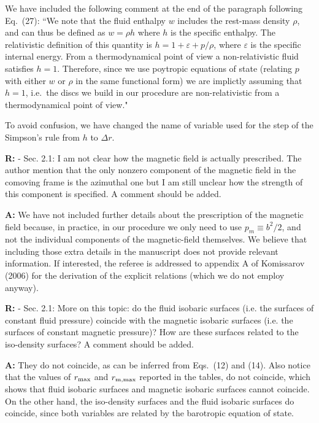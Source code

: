 \documentclass{article}
\begin{document}
\bigskip 

We have included the following comment at the end of the paragraph following Eq.~(27): 
``We note that the fluid enthalpy $w$ includes the rest-mass density $\rho$, and can thus be defined as $w=\rho h$ where
$h$ is the specific enthalpy. The relativistic definition of this quantity is $h=1+\varepsilon+p/\rho$, where $\varepsilon$ is
the specific internal energy. From a thermodynamical point of view a non-relativistic fluid satisfies $h=1$. Therefore,
since we use poytropic equations of state (relating $p$ with either $w$ or $\rho$ in the same functional form) we are
implictly assuming that $h=1$, i.e.~the discs we build in our procedure are non-relativistic from a thermodynamical point of view."

\bigskip

To avoid confusion, we have changed the name of variable used for the step of the Simpson's rule from $h$ to $\Delta r$.

\bigskip

{\bf R:} - Sec. 2.1: I am not clear how the magnetic field is actually
prescribed. The author mention that the only nonzero component of
the magnetic field in the comoving frame is the azimuthal one but I am
still unclear how the strength of this component is specified. A
comment should be added.

\bigskip

{\bf A:} We have not included further details about the prescription of the magnetic field because, in practice, in our procedure we 
only need to use $p_m\equiv b^2/2$,
and not the individual components of the magnetic-field themselves. We believe that including those extra details in the manuscript does not
provide relevant information. If interested, the referee is addressed to appendix A of Komissarov 
(2006) for the derivation of the explicit relations (which we do not employ anyway).

\bigskip

{\bf R:} - Sec. 2.1: More on this topic: do the fluid isobaric surfaces (i.e. the
surfaces of constant fluid pressure) coincide with the magnetic
isobaric surfaces (i.e. the surfaces of constant magnetic pressure)?
How are these surfaces related to the iso-density surfaces? A comment
should be added.

\bigskip

{\bf A:} They do not coincide, as can be inferred from Eqs.~(12) and (14). Also notice that the values of $r_{\rm max}$ and $r_{\rm m,max}$ reported in the tables, do not coincide, which shows that fluid isobaric surfaces and magnetic isobaric surfaces cannot coincide. On the other hand, the iso-density surfaces and the fluid isobaric surfaces do coincide, since both variables are related by the barotropic equation of state.
\end{document}
